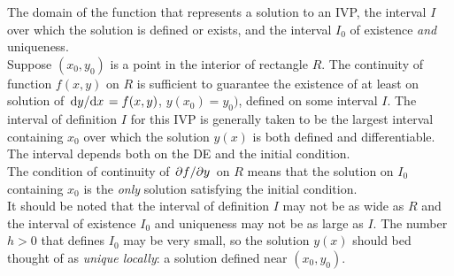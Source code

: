 \documentclass[../Differential Equations.tex]{subfiles}
\begin{document}
			The domain of the function that represents a solution to an IVP, the interval \(I\) over which the solution is defined or exists, and the interval \(I_0\) of existence \textit{and} uniqueness. \\
			Suppose \((x_0, y_0)\) is a  point in the interior of rectangle \(R\). The continuity of function \(f(x, y)\) on \(R\) is sufficient to guarantee the existence of at least on solution of \(\dv*{y}{x} = f(x, y)\), \(y(x_0) = y_0)\), defined on some interval \(I\). The interval of definition \(I\) for this IVP is generally taken to be the largest interval containing \(x_0\) over which the solution \(y(x)\) is both defined and differentiable. The interval depends both on the DE and the initial condition. \\
			The condition of continuity of \(\pdv*{f}{y}\) on \(R\) means that the solution on \(I_0\) containing \(x_0\) is the \textit{only} solution satisfying the initial condition. \\
			It should be noted that the interval of definition \(I\) may not be as wide as \(R\) and the interval of existence \(I_0\) and uniqueness may not be as large as \(I\). The number \(h > 0\) that defines \(I_0\) may be very small, so the solution \(y(x)\) should bed thought of as \textit{unique locally}: a solution defined near \((x_0, y_0)\).
\end{document}
